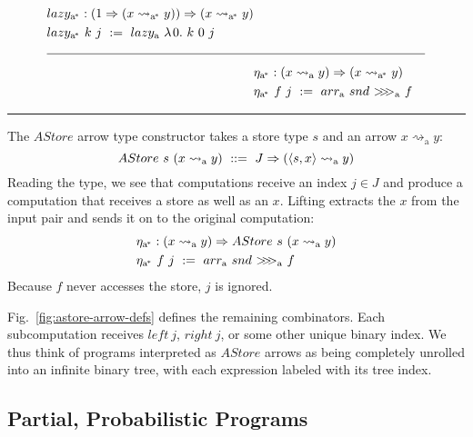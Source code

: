 \documentclass{llncs}
\newcommand{\figref}[1]{Fig.~\ref{#1}}
\newcommand{\arrow}{\rightsquigarrow}
\newcommand{\arrowarr}{\ensuremath{arr}}
\newcommand{\arrowcomp}{\ensuremath{{>}\mspace{-6mu}{>}\mspace{-6mu}{>}}}
\newcommand{\arrowlazy}{\ensuremath{lazy}}
\newcommand{\arrowtrans}{\ensuremath{\eta}}
\newcommand{\gen}{_\mathrm{a}}
\newcommand{\genc}{_\mathrm{a^{\mspace{-2mu}*}}}
\begin{document}
\begin{figure*}[t]
\begin{align*}
\begin{aligned}[t]
\begin{aligned}[t]
		&\arrowlazy\genc : (1 \tto (x \arrow\genc y)) \tto (x \arrow\genc y) \\
		&\arrowlazy\genc~k~j \ := \ \arrowlazy\gen~\fun{0}{k~0~j}
	\end{aligned} \\
\\[-6pt]
\hline
\\[-6pt]
	&\begin{aligned}[t]
		&\arrowtrans\genc : (x \arrow\gen y) \tto (x \arrow\genc y) \\
		&\arrowtrans\genc~f~j \ := \ \arrowarr\gen~snd~\arrowcomp\gen~f
	\end{aligned}
\end{aligned}
\end{align*}
\hrule
\caption[ ]{$AStore$ (associative store) arrow transformer definitions.}
\label{fig:astore-arrow-defs}
\end{figure*}

The $AStore$ arrow type constructor takes a store type $s$ and an arrow $x \arrow\gen y$:
\begin{equation}
	AStore~s~(x \arrow\gen y) \ ::= \ J \tto (\pair{s,x} \arrow\gen y)
\end{equation}
Reading the type, we see that computations receive an index $j \in J$ and produce a computation that receives a store as well as an $x$.
Lifting extracts the $x$ from the input pair and sends it on to the original computation:
\begin{equation}
\begin{aligned}
	&\arrowtrans\genc : (x \arrow\gen y) \tto AStore~s~(x \arrow\gen y) \\
	&\arrowtrans\genc~f~j \ := \ \arrowarr\gen~snd~\arrowcomp\gen~f
\end{aligned}
\end{equation}
Because $f$ never accesses the store, $j$ is ignored.

\figref{fig:astore-arrow-defs} defines the remaining combinators.
Each subcomputation receives $left~j$, $right~j$, or some other unique binary index.
We thus think of programs interpreted as $AStore$ arrows as being completely unrolled into an infinite binary tree, with each expression labeled with its tree index.

\subsection{Partial, Probabilistic Programs}
\label{sec:probabilistic-programs}
\end{document}
